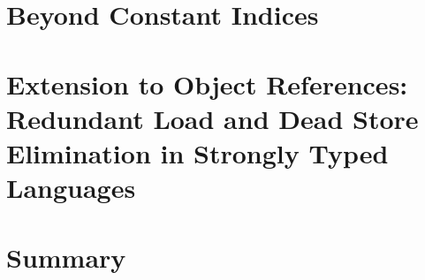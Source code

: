 \section{Beyond Constant Indices}
\label{sec:non-const}



\section{Extension to Object References: Redundant Load and Dead Store Elimination in Strongly Typed Languages}
\label{sec:heap}


\section{Summary}
\label{sec:conclusions}

